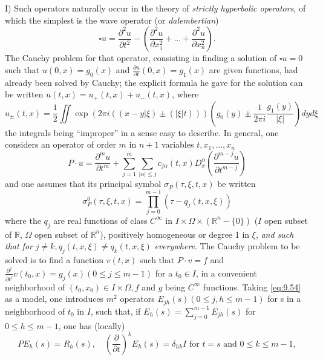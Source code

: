\documentclass[12pt,a4paper,leqno,twoside]{extbook}
\newcommand{\R}{\mathbb{R}}
\newcommand{\pder}[2]{\frac{\partial #1}{\partial #2}}
\begin{document}
I) Such operators naturally occur in the theory of \emph{strictly hyperbolic operators}, of which the simplest is the wave operator (or \emph{dalembertian})
\begin{equation}
    \label{eq:9.53}
    \square u = \pder{^2 u}{t^2} - \left( \pder{^2 u}{x^2_1} + \ldots + \pder{^2 u}{x^2_n} \right).
\end{equation}
The Cauchy problem for that operator, consisting in finding a solution of \(\square u = 0\) such that \(u(0,x) = g_0(x)\) and \(\pder{u}{t}(0, x) = g_1(x)\) are given functions, had already been solved by Cauchy; the explicit formula he gave for the solution can be written \(u(t,x) = u_+(t,x) + u_-(t,x)\), where
\begin{equation}
    \label{eq:9.54}
    u_\pm(t,x) = \frac{1}{2} \iint \exp(2\pi i((x-y|\xi) \pm (|\xi|t))) \left( g_0(y) \pm \frac{1}{2\pi i} \frac{g_1(y)}{|\xi|} \right) dy d\xi
\end{equation}
the integrals being ``improper'' in a sense easy to describe. In general, one considers an operator of order \(m\) in \(n+1\) variables \(t, x_1, \ldots, x_n\)
\begin{equation}
    \label{eq:9.55}
    P \cdot u = \pder{^m u}{t^m} + \sum_{j=1}^m \sum_{|\alpha| \leq j} c_{j \alpha}(t,x) D^\alpha_x \left( \pder{^{m-j} u}{t^{m-j}} \right)
\end{equation}
and one assumes that its principal symbol \(\sigma_P(\tau, \xi, t, x)\) be written
\begin{equation}
    \label{eq:9.56}
    \sigma^0_P(\tau, \xi, t, x) = \prod_{j=0}^{m-1} \left( \tau - q_j(t, x, \xi) \right)
\end{equation}
where the \(q_j\) are real functions of class \(C^\infty\) in \(I \times \Omega \times (\R^n - \{0\})\) (\(I\) open subset of \(\R\), \(\Omega\) open subset of \(\R^n\)), positively homogeneous or degree 1 in \(\xi\), \emph{and such that for} \(j \neq k, q_j(t,x,\xi) \neq q_k(t,x,\xi)\) \emph{everywhere}. The Cauchy problem to be solved is to find a function \(v(t,x)\) such that \(P \cdot v = f\) and \(\pder{^j}{t^j} v(t_0, x) = g_j(x) (0 \leq j \leq m-1)\) for a \(t_0 \in I\), in a convenient neighborhood of \((t_0,x_0) \in I \times \Omega, f\) and \(g\) being \(C^\infty\) functions. Taking \eqref{eq:9.54} as a model, one introduces \(m^2\) operators \(E_{jh}(s) (0 \leq j, h \leq m-1)\) for s in a neighborhood of \(t_0\) in \(I\), such that, if \(E_h(s) = \sum\limits_{j=0}^{m-1} E_{jh}(s)\) for \(0 \leq h \leq m-1\), one has (locally)
\begin{equation}
    \label{eq:9.57}
    PE_h(s) = R_h(s), \quad \left(\pder{}{t}\right)^k E_h(s) = \delta_{hk}I \text{ for } t=s \text{ and } 0 \leq k \leq m-1,
\end{equation}
\end{document}
